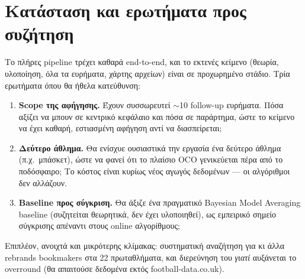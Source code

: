 \documentclass[11pt,a4paper]{article}
\renewcommand{\_}{\oldunderscore\allowbreak}
\begin{document}
\section{Κατάσταση και ερωτήματα προς συζήτηση}

Το πλήρες pipeline τρέχει καθαρά end-to-end, και το εκτενές κείμενο (θεωρία, υλοποίηση, όλα
τα ευρήματα, χάρτης αρχείων) είναι σε προχωρημένο στάδιο. Τρία ερωτήματα όπου θα ήθελα
κατεύθυνση:

\begin{enumerate}
  \item \textbf{Scope της αφήγησης.} Έχουν συσσωρευτεί $\sim$10 follow-up ευρήματα. Πόσα
        αξίζει να μπουν σε κεντρικό κεφάλαιο και πόσα σε παράρτημα, ώστε το κείμενο να έχει
        καθαρή, εστιασμένη αφήγηση αντί να διασπείρεται;
  \item \textbf{Δεύτερο άθλημα.} Θα ενίσχυε ουσιαστικά την εργασία ένα δεύτερο άθλημα
        (π.χ.\ μπάσκετ), ώστε να φανεί ότι το πλαίσιο OCO γενικεύεται πέρα από το ποδόσφαιρο;
        Το κόστος είναι κυρίως νέος αγωγός δεδομένων --- οι αλγόριθμοι δεν αλλάζουν.
  \item \textbf{Baseline προς σύγκριση.} Θα άξιζε ένα πραγματικό Bayesian Model Averaging
        baseline (συζητείται θεωρητικά, δεν έχει υλοποιηθεί), ως εμπειρικό σημείο σύγκρισης
        απέναντι στους online αλγορίθμους;
\end{enumerate}

Επιπλέον, ανοιχτά και μικρότερης κλίμακας: συστηματική αναζήτηση για κι άλλα rebrands
bookmakers στα 22 πρωταθλήματα, και διερεύνηση του \emph{γιατί} αυξάνεται το overround (θα
απαιτούσε δεδομένα εκτός football-data.co.uk).
\end{document}

